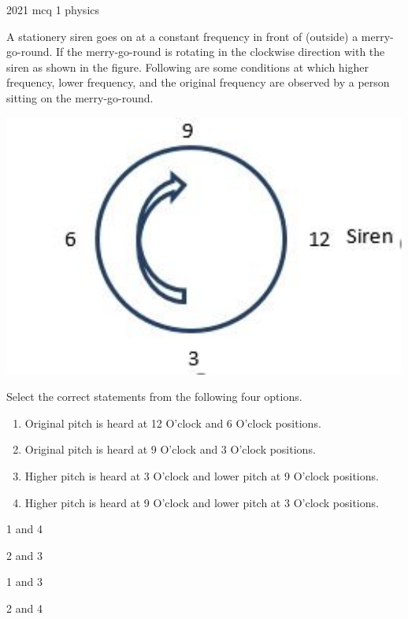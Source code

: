 \ylDisplay
{}%
{2021}%
{mcq}%
{1}%
{physics}%
{}%
{
\ifStatement
A stationery siren goes on at a constant frequency in front of (outside) a merry-go-round. If the merry-go-round is rotating in the clockwise direction with the siren as shown in the figure. Following are some conditions at which higher frequency, lower frequency, and the original frequency are observed by a person sitting on the merry-go-round.
\begin{center}
  \includegraphics[width=0.4\linewidth]{2021-mcq-01-p}
\end{center}
Select the correct statements from the following four options.
\begin{enumerate}
  \item Original pitch is heard at 12 O’clock and 6 O’clock positions.
  \item Original pitch is heard at 9 O’clock and 3 O’clock positions.
  \item Higher pitch is heard at 3 O’clock and lower pitch at 9 O’clock positions.
  \item Higher pitch is heard at 9 O’clock and lower pitch at 3 O’clock positions.
\end{enumerate}
\fi


1 and 4
\fi


2 and 3
\fi


1 and 3
\fi


2 and 4
\fi


\ifHint

\fi


\ifSolution

\fi


}
